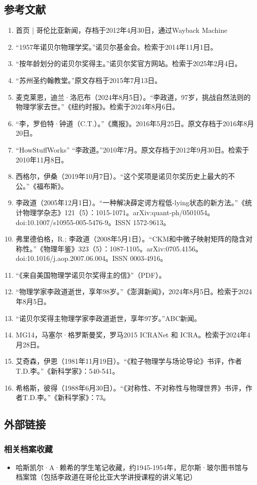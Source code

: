 \subsection{参考文献}  
\begin{enumerate}
\item 首页 | 哥伦比亚新闻，存档于2012年4月30日，通过Wayback Machine  
\item “1957年诺贝尔物理学奖。”诺贝尔基金会。检索于2014年11月1日。  
\item “按年龄划分的诺贝尔奖得主。”诺贝尔奖官方网站。检索于2025年2月4日。  
\item “苏州圣约翰教堂。”原文存档于2015年7月13日。  
\item 麦克莱恩，迪兰·洛厄布（2024年8月5日）。“李政道，97岁，挑战自然法则的物理学家去世。”《纽约时报》。检索于2024年8月6日。  
\item “李，罗伯特·钟道（C.T.）。”《鹰报》。2016年5月25日。原文存档于2016年8月20日。  
\item “HowStuffWorks” “李政道。”2010年7月。原文存档于2012年9月30日。检索于2010年11月8日。  
\item 西格尔，伊桑（2019年10月7日）。“这个奖项是诺贝尔奖历史上最大的不公。”《福布斯》。  
\item 李政道（2005年12月1日）。“一种解决薛定谔方程低-lying状态的新方法。”《统计物理学杂志》121（5）：1015-1071。arXiv:quant-ph/0501054。doi:10.1007/s10955-005-5476-9。ISSN 1572-9613。  
\item 弗里德伯格，R.; 李政道（2008年5月1日）。“CKM和中微子映射矩阵的隐含对称性。”《物理年鉴》323（5）：1087-1105。arXiv:0705.4156。doi:10.1016/j.aop.2007.06.004。ISSN 0003-4916。
\item “《来自美国物理学诺贝尔奖得主的信》”（PDF）。  
\item “物理学家李政道逝世，享年98岁。”《澎湃新闻》，2024年8月5日。检索于2024年8月5日。  
\item “诺贝尔奖得主物理学家李政道逝世，享年97岁。”ABC新闻。  
\item MG14，马塞尔·格罗斯曼奖，罗马2015 ICRANet 和 ICRA。检索于2024年4月28日。  
\item 艾奇森，伊恩（1981年11月19日）。“《粒子物理学与场论导论》书评，作者T.D.李。”《新科学家》：540-541。  
\item 希格斯，彼得（1988年6月30日）。“《对称性、不对称性与物理世界》书评，作者T.D.李。”《新科学家》：73。
\end{enumerate}
\subsection{外部链接}

\subsubsection{相关档案收藏} 
\begin{itemize}
\item 哈斯凯尔·A·赖希的学生笔记收藏，约1945-1954年，尼尔斯·玻尔图书馆与档案馆（包括李政道在哥伦比亚大学讲授课程的讲义笔记）
\end{itemize}